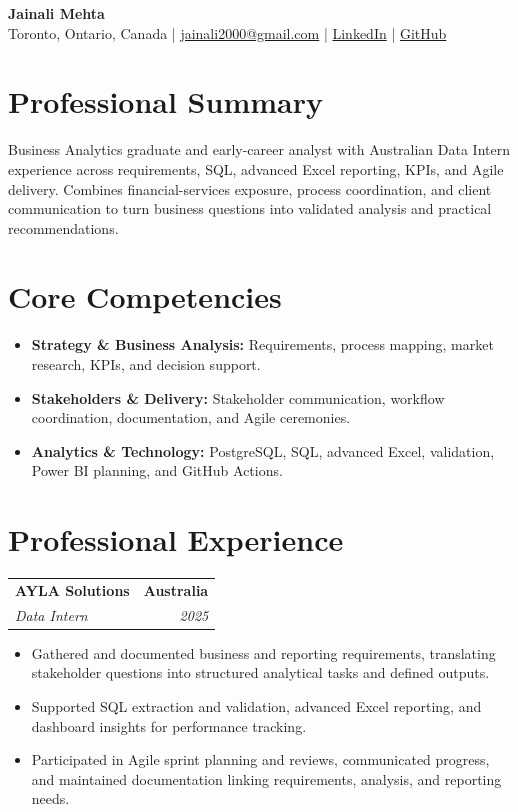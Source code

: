 \documentclass[letterpaper,10pt]{article}
\makeatletter
\newcommand{\role}[4]{%
  \begin{tabularx}{\textwidth}{@{}Xr@{}}
    \textbf{#1} & \textbf{#2} \\
    \textit{#3} & \textit{#4}
  \end{tabularx}\vspace{-1pt}
}
\makeatother
\begin{document}
\begin{center}
  {\fontsize{17}{19}\selectfont\textbf{Jainali Mehta}}\\[2pt]
  \small Toronto, Ontario, Canada \;|\;
  \href{mailto:jainali2000@gmail.com}{jainali2000@gmail.com} \;|\;
  \href{https://www.linkedin.com/in/jainali-mehta}{LinkedIn} \;|\;
  \href{https://github.com/jainalimehta}{GitHub}
\end{center}
\vspace{-7pt}

\section{Professional Summary}
Business Analytics graduate and early-career analyst with Australian Data Intern experience across requirements, SQL, advanced Excel reporting, KPIs, and Agile delivery. Combines financial-services exposure, process coordination, and client communication to turn business questions into validated analysis and practical recommendations.

\section{Core Competencies}
\begin{itemize}[topsep=0pt,itemsep=1.2pt,parsep=0pt]
  \item \textbf{Strategy \& Business Analysis:} Requirements, process mapping, market research, KPIs, and decision support.
  \item \textbf{Stakeholders \& Delivery:} Stakeholder communication, workflow coordination, documentation, and Agile ceremonies.
  \item \textbf{Analytics \& Technology:} PostgreSQL, SQL, advanced Excel, validation, Power BI planning, and GitHub Actions.
\end{itemize}

\section{Professional Experience}
\role{AYLA Solutions}{Australia}{Data Intern}{2025}
\begin{itemize}
  \item Gathered and documented business and reporting requirements, translating stakeholder questions into structured analytical tasks and defined outputs.
  \item Supported SQL extraction and validation, advanced Excel reporting, and dashboard insights for performance tracking.
  \item Participated in Agile sprint planning and reviews, communicated progress, and maintained documentation linking requirements, analysis, and reporting needs.
\end{itemize}
\vspace{0.7pt}
\end{document}
